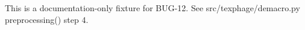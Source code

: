 \documentclass{article}
\begin{document}
This is a documentation-only fixture for BUG-12.
See src/texphage/demacro.py preprocessing() step 4.
\end{document}
